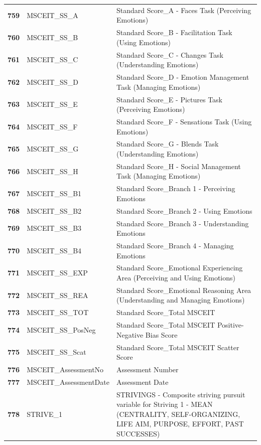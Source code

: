 \documentclass[
  letterpaper,
  DIV=11,
  numbers=noendperiod]{scrartcl}
\begin{document}
\begin{longtable}[t]{>{}cll}
\textbf{759} & MSCEIT\_SS\_A & Standard Score\_A - Faces Task (Perceiving Emotions)\\
\textbf{760} & MSCEIT\_SS\_B & Standard Score\_B - Facilitation Task (Using Emotions)\\
\addlinespace
\textbf{761} & MSCEIT\_SS\_C & Standard Score\_C - Changes Task (Understanding Emotions)\\
\textbf{762} & MSCEIT\_SS\_D & Standard Score\_D - Emotion Management Task (Managing Emotions)\\
\textbf{763} & MSCEIT\_SS\_E & Standard Score\_E - Pictures Task (Perceiving Emotions)\\
\textbf{764} & MSCEIT\_SS\_F & Standard Score\_F - Sensations Task (Using Emotions)\\
\textbf{765} & MSCEIT\_SS\_G & Standard Score\_G - Blends Task (Understanding Emotions)\\
\addlinespace
\textbf{766} & MSCEIT\_SS\_H & Standard Score\_H - Social Management Task (Managing Emotions)\\
\textbf{767} & MSCEIT\_SS\_B1 & Standard Score\_Branch 1 - Perceiving Emotions\\
\textbf{768} & MSCEIT\_SS\_B2 & Standard Score\_Branch 2 - Using Emotions\\
\textbf{769} & MSCEIT\_SS\_B3 & Standard Score\_Branch 3 - Understanding Emotions\\
\textbf{770} & MSCEIT\_SS\_B4 & Standard Score\_Branch 4 - Managing Emotions\\
\addlinespace
\textbf{771} & MSCEIT\_SS\_EXP & Standard Score\_Emotional Experiencing Area (Perceiving and Using Emotions)\\
\textbf{772} & MSCEIT\_SS\_REA & Standard Score\_Emotional Reasoning Area (Understanding and Managing Emotions)\\
\textbf{773} & MSCEIT\_SS\_TOT & Standard Score\_Total MSCEIT\\
\textbf{774} & MSCEIT\_SS\_PosNeg & Standard Score\_Total MSCEIT Positive-Negative Bias Score\\
\textbf{775} & MSCEIT\_SS\_Scat & Standard Score\_Total MSCEIT Scatter Score\\
\addlinespace
\textbf{776} & MSCEIT\_AssessmentNo & Assessment Number\\
\textbf{777} & MSCEIT\_AssessmentDate & Assessment Date\\
\textbf{778} & STRIVE\_1 & STRIVINGS - Composite striving pursuit variable for Striving 1 - MEAN (CENTRALITY, SELF-ORGANIZING, LIFE AIM, PURPOSE, EFFORT, PAST SUCCESSES)\\

\end{longtable}
\end{document}
